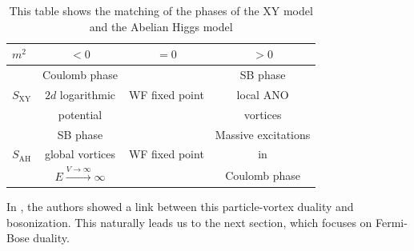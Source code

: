    \begin{table}
\begin{center}
  \begin{tabular}{| l | c | c | c|}
      \hline
    $m^2$ & $<0$ & $=0$ & $>0$\\ \hline
     & Coulomb phase &  & SB phase\\ 
    $S_{\text{XY}}$ & $2d$ logarithmic & WF fixed point & local ANO \\ 
     & potential &  & vortices \\ \hline
      & SB phase &  &  Massive excitations\\
    $S_{\text{AH}}$ & global vortices & WF fixed point & in\\
      & $E\xrightarrow{V \rightarrow \infty} \infty$ &  & Coulomb phase \\
    \hline
  \end{tabular}
\end{center}
      \caption{This table shows the matching of the phases of the XY model and the Abelian Higgs model}
        \label{table:PV_Duality}
    \end{table}
In \cite{1606.01893}, the authors showed a link between this particle-vortex duality and bosonization. This naturally leads us to the next section, which focuses on Fermi-Bose duality.


%


